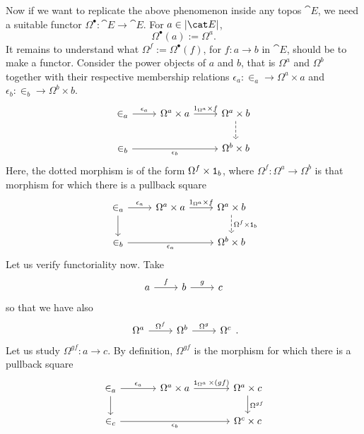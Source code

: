 Now if we want to replicate the above phenomenon inside any topos \(\cat E\), we need a suitable functor \(\Omega^\bullet : \cat E \to \cat E\). For \(a \in \abs{\cat E}\),
\[\Omega^\bullet (a) := \Omega^a .\]
It remains to understand what \(\Omega^f := \Omega^\bullet (f)\), for \(f : a \to b\) in \(\cat E\), should be to make a functor. Consider the power objects of \(a\) and \(b\), that is \(\Omega^a\) and \(\Omega^b\) together with their respective membership relations \(\epsilon_a : \in_a \to \Omega^a \times a\) and \(\epsilon_b : \in_b \to \Omega^b \times b\).
\[\begin{tikzcd}
\in_a \ar["{\epsilon_a}", r] & \Omega^a \times a \ar["{1_{\Omega^a} \times f}", r] & \Omega^a \times b \ar[dashed, d] \\
\in_b \ar["{\epsilon_b}", rr, swap] & & \Omega^b \times b
\end{tikzcd}\]
Here, the dotted morphism is of the form \(\Omega^f \times \operatorname{\mathtt 1}_b\), where \(\Omega^f : \Omega^a \to \Omega^b\) is that morphism for which there is a pullback square
\[\begin{tikzcd}
\in_a \ar["{\epsilon_a}", r] \ar[d] & \Omega^a \times a \ar["{1_{\Omega^a} \times f}", r] & \Omega^a \times b \ar["{\Omega^f \times \id_b}", d, dashed] \\
\in_b \ar["{\epsilon_a}", rr, swap] & & \Omega^b \times b
\end{tikzcd}\]
Let us verify functoriality now. Take
\[\begin{tikzcd} a \ar["f", r] & b \ar["g", r] & c \end{tikzcd}\]
so that we have also
\[\begin{tikzcd} \Omega^a \ar["{\Omega^f}", r] & \Omega^b \ar["{\Omega^g}", r] & \Omega^c \end{tikzcd} .\]
Let us study \(\Omega^{gf} : a \to c\). By definition, \(\Omega^{gf}\) is the morphism for which there is a pullback square
\begin{equation}\begin{tikzcd}[column sep=large]
\in_a \ar["{\epsilon_a}", r] \ar[d] & \Omega^a \times a \ar["{\id_{\Omega^a} \times (gf)}", r] & \Omega^a \times c \ar["{\Omega^{gf}}", d] \\
\in_c \ar["{\epsilon_b}", rr, swap] & & \Omega^c \times c
\end{tikzcd}\label{commu:omegagf}\end{equation}
